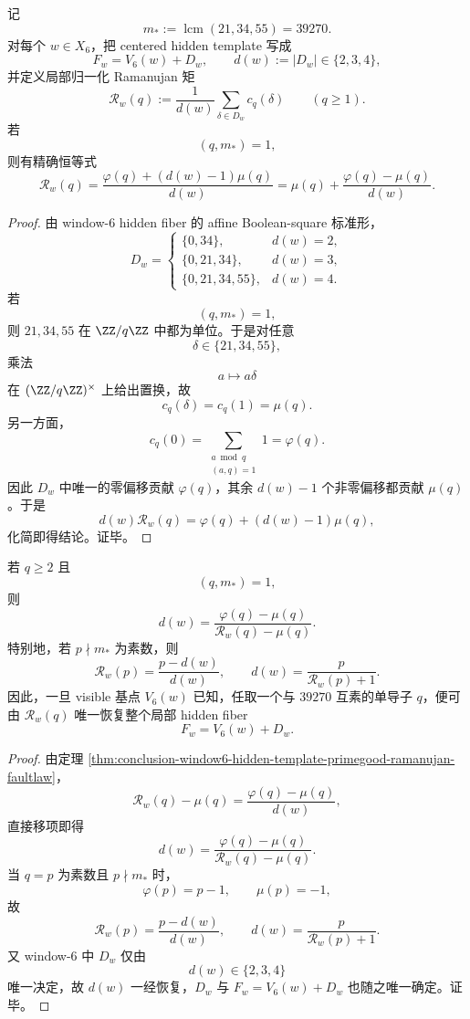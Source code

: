 \begin{theorem}\label{thm:conclusion-window6-hidden-template-primegood-ramanujan-faultlaw}
记
\[
m_*:=\operatorname{lcm}(21,34,55)=39270.
\]
对每个 \(w\in X_6\)，把 centered hidden template 写成
\[
F_w=V_6(w)+D_w,
\qquad
d(w):=|D_w|\in\{2,3,4\},
\]
并定义局部归一化 Ramanujan 矩
\[
\mathcal R_w(q):=\frac1{d(w)}\sum_{\delta\in D_w}c_q(\delta)
\qquad (q\ge 1).
\]
若
\[
(q,m_*)=1,
\]
则有精确恒等式
\[
\mathcal R_w(q)
=
\frac{\varphi(q)+(d(w)-1)\mu(q)}{d(w)}
=
\mu(q)+\frac{\varphi(q)-\mu(q)}{d(w)}.
\]
\end{theorem}
\begin{proof}
由 window-\(6\) hidden fiber 的 affine Boolean-square 标准形，
\[
D_w=
\begin{cases}
\{0,34\},& d(w)=2,\\
\{0,21,34\},& d(w)=3,\\
\{0,21,34,55\},& d(w)=4.
\end{cases}
\]
若
\[
(q,m_*)=1,
\]
则 \(21,34,55\) 在 \(\ZZ/q\ZZ\) 中都为单位。于是对任意
\[
\delta\in\{21,34,55\},
\]
乘法
\[
a\longmapsto a\delta
\]
在 \((\ZZ/q\ZZ)^\times\) 上给出置换，故
\[
c_q(\delta)=c_q(1)=\mu(q).
\]
另一方面，
\[
c_q(0)=\sum_{\substack{a\bmod q\\(a,q)=1}}1=\varphi(q).
\]
因此 \(D_w\) 中唯一的零偏移贡献 \(\varphi(q)\)，其余 \(d(w)-1\) 个非零偏移都贡献 \(\mu(q)\)。于是
\[
d(w)\mathcal R_w(q)=\varphi(q)+(d(w)-1)\mu(q),
\]
化简即得结论。证毕。
\end{proof}

\begin{corollary}\label{cor:conclusion-window6-single-good-conductor-reconstructs-hidden-template}
若 \(q\ge 2\) 且
\[
(q,m_*)=1,
\]
则
\[
d(w)=\frac{\varphi(q)-\mu(q)}{\mathcal R_w(q)-\mu(q)}.
\]
特别地，若 \(p\nmid m_*\) 为素数，则
\[
\mathcal R_w(p)=\frac{p-d(w)}{d(w)},
\qquad
d(w)=\frac{p}{\mathcal R_w(p)+1}.
\]
因此，一旦 visible 基点 \(V_6(w)\) 已知，任取一个与 \(39270\) 互素的单导子 \(q\)，便可由 \(\mathcal R_w(q)\) 唯一恢复整个局部 hidden fiber
\[
F_w=V_6(w)+D_w.
\]
\end{corollary}
\begin{proof}
由定理 \ref{thm:conclusion-window6-hidden-template-primegood-ramanujan-faultlaw}，
\[
\mathcal R_w(q)-\mu(q)=\frac{\varphi(q)-\mu(q)}{d(w)},
\]
直接移项即得
\[
d(w)=\frac{\varphi(q)-\mu(q)}{\mathcal R_w(q)-\mu(q)}.
\]
当 \(q=p\) 为素数且 \(p\nmid m_*\) 时，
\[
\varphi(p)=p-1,\qquad \mu(p)=-1,
\]
故
\[
\mathcal R_w(p)=\frac{p-d(w)}{d(w)},
\qquad
d(w)=\frac{p}{\mathcal R_w(p)+1}.
\]
又 window-\(6\) 中 \(D_w\) 仅由
\[
d(w)\in\{2,3,4\}
\]
唯一决定，故 \(d(w)\) 一经恢复，\(D_w\) 与 \(F_w=V_6(w)+D_w\) 也随之唯一确定。证毕。
\end{proof}
